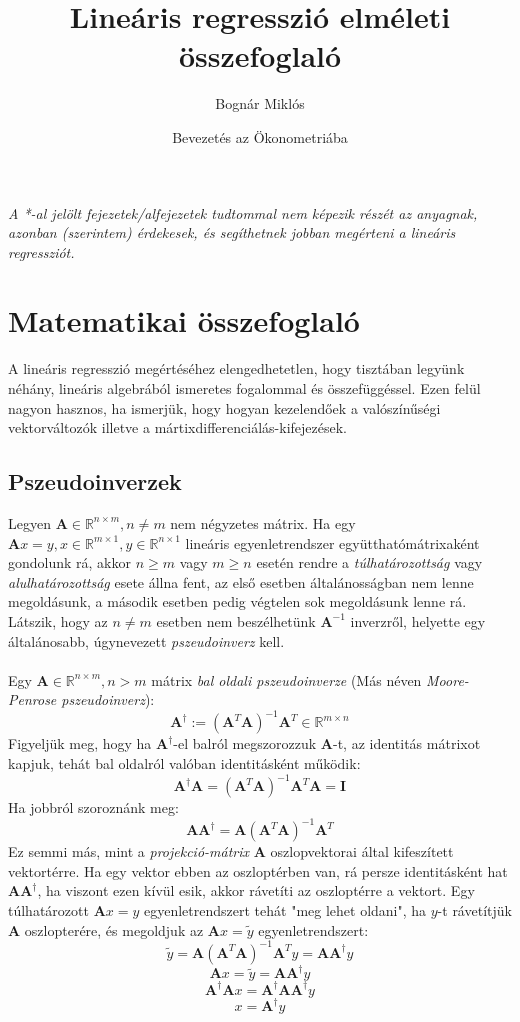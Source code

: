 \documentclass[14p]{report}
\title{Lineáris regresszió elméleti összefoglaló}
\author{Bognár Miklós}
\date{Bevezetés az Ökonometriába}
\def\pmb{\boldsymbol}
\begin{document}
	\maketitle
	\tableofcontents
	\vspace{2cm}
	\emph{A *-al jelölt fejezetek/alfejezetek tudtommal nem képezik részét az anyagnak, azonban (szerintem) érdekesek, és segíthetnek jobban megérteni a lineáris regressziót.}
	\newpage
	\section{Matematikai összefoglaló}
	A lineáris regresszió megértéséhez elengedhetetlen, hogy tisztában legyünk néhány, lineáris algebrából ismeretes fogalommal és összefüggéssel. Ezen felül nagyon hasznos, ha ismerjük, hogy hogyan kezelendőek a valószínűségi vektorváltozók illetve a mártixdifferenciálás-kifejezések.  
	
	\subsection{Pszeudoinverzek}
	Legyen $\pmb{A} \in \mathbb{R}^{n\times m}, n \ne m$ nem négyzetes mátrix. Ha egy  $\pmb{A}x = y , x \in \mathbb{R}^{m\times 1}, y \in \mathbb{R}^{n \times 1}$ lineáris egyenletrendszer együtthatómátrixaként gondolunk rá, akkor $n \ge m$ vagy $m \ge n$ esetén rendre a \emph{túlhatározottság} vagy \emph{alulhatározottság} esete állna fent, az első esetben általánosságban nem lenne megoldásunk, a második esetben pedig végtelen sok megoldásunk lenne rá. Látszik, hogy az $n \ne m$ esetben nem beszélhetünk $\pmb{A}^{-1}$ inverzről, helyette egy általánosabb, úgynevezett \emph{pszeudoinverz} kell.
	\\
	\\
	Egy $\pmb{A} \in \mathbb{R}^{n \times m}, n > m$ mátrix \emph{bal oldali pszeudoinverze} (Más néven \emph{Moore-Penrose pszeudoinverz}):
	\[
	\pmb{A}^{\dagger} := (\pmb{A}^T\pmb{A})^{-1}\pmb{A}^T \in \mathbb{R}^{m \times n}
	\]
	Figyeljük meg, hogy ha $\pmb{A}^{\dagger}$-el balról megszorozzuk $\pmb{A}$-t, az identitás mátrixot kapjuk, tehát bal oldalról valóban identitásként működik:
	\[
	\pmb{A}^{\dagger}\pmb{A} = (\pmb{A}^T\pmb{A})^{-1}\pmb{A}^T\pmb{A} = \pmb{I}
	\]
	Ha jobbról szoroznánk meg:
	\[
	\pmb{A}\pmb{A}^{\dagger} = \pmb{A}(\pmb{A}^T\pmb{A})^{-1}\pmb{A}^T
	\]
	Ez semmi más, mint a \emph{projekció-mátrix} $\pmb{A}$ oszlopvektorai által kifeszített vektortérre. Ha egy vektor ebben az oszloptérben van, rá persze identitásként hat $\pmb{A}\pmb{A}^{\dagger}$, ha viszont ezen kívül esik, akkor rávetíti az oszloptérre a vektort. Egy túlhatározott $\pmb{A}x = y$ egyenletrendszert tehát "meg lehet oldani", ha $y$-t rávetítjük $\pmb{A}$ oszlopterére, és megoldjuk az $\pmb{A}x = \tilde{y}$ egyenletrendszert: 
	\[
	\tilde{y} = \pmb{A}(\pmb{A}^T\pmb{A})^{-1}\pmb{A}^T y = \pmb{A}\pmb{A}^{\dagger} y
	\]
	\[
	\pmb{A}x = \tilde{y} = \pmb{A}\pmb{A}^{\dagger}y
	\]
	\[
	\pmb{A}^{\dagger}\pmb{A}x = \pmb{A}^{\dagger}\pmb{A}\pmb{A}^{\dagger}y
	\]
	\[
	x  = \pmb{A}^{\dagger}y
	\]
	
\end{document}
